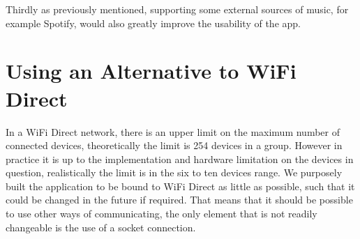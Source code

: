 Thirdly as previously mentioned, supporting some external sources of music, for example Spotify, would also greatly improve the usability of the app.

\section{Using an Alternative to WiFi Direct}
In a WiFi Direct network, there is an upper limit on the maximum number of connected devices, theoretically the limit is 254 devices in a group.
However in practice it is up to the implementation and hardware limitation on the devices in question, realistically the limit is in the six to ten devices range.
We purposely built the application to be bound to WiFi Direct as little as possible, such that it could be changed in the future if required.
That means that it should be possible to use other ways of communicating, the only element that is not readily changeable is the use of a socket connection.





